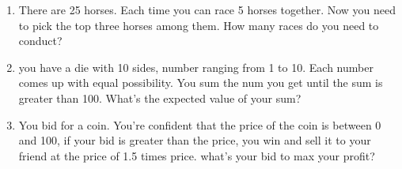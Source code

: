 \documentclass{article}
\begin{document}
\begin{enumerate}
    \item There are 25 horses. Each time you can race 5 horses together. Now you need to pick the top three horses among them. How many races do you need to conduct?

    \item you have a die with 10 sides, number ranging from 1 to 10. Each number comes up with equal possibility. You sum the num you get until the sum is greater than 100. What's the expected value of your sum?

    \item You bid for a coin. You're confident that the price of the coin is between 0 and 100, if your bid is greater than the price, you win and sell it to your friend at the price of 1.5 times price. what's your bid to max your profit?
    
    

\end{enumerate}

    
\end{document}
